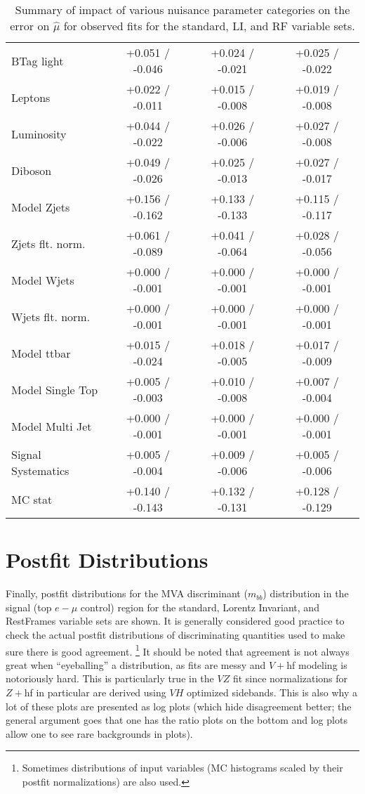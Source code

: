 \begin{table}[!htbp]
\begin{center}
\begin{tabular}{lccc}
BTag light &  +0.051 / -0.046  &  +0.024 / -0.021  &  +0.025 / -0.022 \\
Leptons &  +0.022 / -0.011  &  +0.015 / -0.008  &  +0.019 / -0.008 \\
Luminosity &  +0.044 / -0.022  &  +0.026 / -0.006  &  +0.027 / -0.008 \\
Diboson &  +0.049 / -0.026  &  +0.025 / -0.013  &  +0.027 / -0.017 \\
Model Zjets &  +0.156 / -0.162  &  +0.133 / -0.133  &  +0.115 / -0.117 \\
Zjets flt. norm. &  +0.061 / -0.089  &  +0.041 / -0.064  &  +0.028 / -0.056 \\
Model Wjets &  +0.000 / -0.001  &  +0.000 / -0.001  &  +0.000 / -0.001 \\
Wjets flt. norm. &  +0.000 / -0.001  &  +0.000 / -0.001  &  +0.000 / -0.001 \\
Model ttbar &  +0.015 / -0.024  &  +0.018 / -0.005  &  +0.017 / -0.009 \\
Model Single Top &  +0.005 / -0.003  &  +0.010 / -0.008  &  +0.007 / -0.004 \\
Model Multi Jet &  +0.000 / -0.001  &  +0.000 / -0.001  &  +0.000 / -0.001 \\
Signal Systematics &  +0.005 / -0.004  &  +0.009 / -0.006  &  +0.005 / -0.006 \\
MC stat &  +0.140 / -0.143  &  +0.132 / -0.131  &  +0.128 / -0.129 \\
\hline\hline
\end{tabular}
\end{center}
\caption{Summary of impact of various nuisance parameter categories on the error on $\hat{\mu}$ for observed fits for the standard, LI, and RF variable sets.}
\label{tab:obsbdvz}
\end{table}

\clearpage
\section{Postfit Distributions}
Finally, postfit distributions for the MVA discriminant ($m_{bb}$) distribution in the signal (top $e-\mu$ control) region for the standard, Lorentz Invariant, and RestFrames variable sets are shown.  It is generally considered good practice to check the actual postfit distributions of discriminating quantities used to make sure there is good agreement.  \footnote{Sometimes distributions of input variables (MC histograms scaled by their postfit normalizations) are also used.}  It should be noted that agreement is not always great when ``eyeballing'' a distribution, as fits are messy and $V+$hf modeling is notoriously hard.  This is particularly true in the $VZ$ fit since normalizations for $Z+$hf in particular are derived using $VH$ optimized sidebands.  This is also why a lot of these plots are presented as log plots (which hide disagreement better; the general argument goes that one has the ratio plots on the bottom and log plots allow one to see rare backgrounds in plots).

